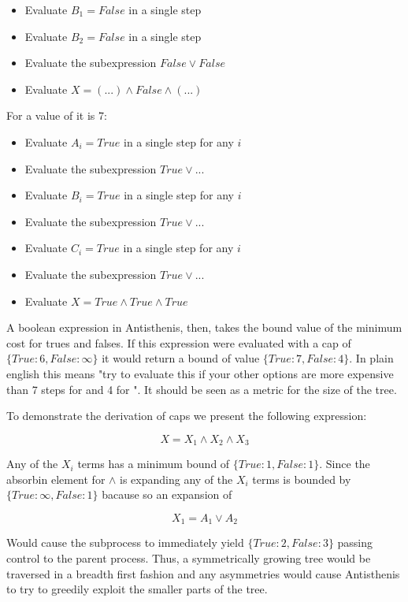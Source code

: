 \begin{itemize}
\item Evaluate \(B_1 = False\) in a single step
\item Evaluate \(B_2 = False\) in a single step
\item Evaluate the subexpression \(False \lor False\)
\item Evaluate \(X = (...) \land False \land (...)\)
\end{itemize}

For a value of  it is 7:

\begin{itemize}
\item Evaluate \(A_i = True\) in a single step for any \(i\)
\item Evaluate the subexpression \(True \lor ...\)
\item Evaluate \(B_i = True\) in a single step for any \(i\)
\item Evaluate the subexpression \(True \lor ...\)
\item Evaluate \(C_i = True\) in a single step for any \(i\)
\item Evaluate the subexpression \(True \lor ...\)
\item Evaluate \(X = True \land True \land True\)
\end{itemize}

A boolean expression in Antisthenis, then, takes the bound value of
the minimum cost for trues and falses. If this expression were
evaluated with a cap of \(\{True: 6, False: \infty \}\) it would
return a bound of value \(\{True: 7, False: 4 \}\). In plain english
this means "try to evaluate this if your other options are more
expensive than 7 steps for  and 4 for ". It
should be seen as a metric for the size of the tree.

To demonstrate the derivation of caps we present the following
expression:

\[
X = X_1 \land X_2 \land X_3
\]

Any of the \(X_i\) terms has a minimum bound of
\(\{True: 1, False: 1 \}\). Since the absorbin element for \(\land\)
is  expanding any of the \(X_i\) terms is bounded by
\(\{True: \infty, False: 1 \}\) bacause so an expansion of

\[
X_1 = A_1 \lor A_2
\]

Would cause the subprocess to immediately yield
\(\{True: 2, False: 3 \}\) passing control to the parent
process. Thus, a symmetrically growing tree would be traversed in a
breadth first fashion and any asymmetries would cause Antisthenis to
try to greedily exploit the smaller parts of the tree.

